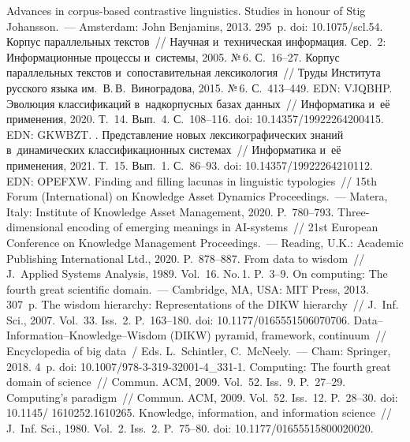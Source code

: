 \begin{multicols}{2}
{\small\frenchspacing
 { %
 \begin{thebibliography}{99}
 Advances in corpus-based contrastive linguistics. Studies in honour 
of Stig Johansson.~--- Amsterdam: John Benjamins, 2013. 295~p.  doi: 10.1075/scl.54.
 Корпус параллельных текстов~// 
Научная и~техническая информация. Сер.~2: Информационные процессы и~сис\-те\-мы, 2005. 
№\,6. С.~16--27.
 Корпус параллельных текстов и~сопоставительная 
лексикология~// Труды Института русского языка им.\ В.\,В.~Виноградова, 2015. №\,6. 
С.~413--449. EDN: VJQBHP.
 Эволюция классификаций 
в~надкорпусных базах данных~// Информатика и~её применения, 2020. Т.~14. Вып.~4. 
С.~108--116. doi: 10.14357/19922264200415.  
EDN: \mbox{GKWBZT}.
. Представление новых 
лексикографических знаний в~динамических классификационных сис\-те\-мах~// 
Информатика и~её применения, 2021. Т.~15. Вып.~1. С.~86--93.  doi: 10.14357/19922264210112. EDN: OPEFXW.
 Finding and filling lacunas in linguistic typologies~// 15th Forum (International) 
on Knowledge Asset Dynamics Proceedings.~--- Matera, Italy: Institute of Knowledge Asset 
Management, 2020. P.~780--793.
 Three-dimensional encoding of emerging meanings in AI-systems~// 21st 
European Conference on Knowledge Management Proceedings.~--- Reading, U.K.: Academic 
Publishing International Ltd., 2020. P.~878--887.
 From data to wisdom~// J.~Applied Systems Analysis, 1989. Vol.~16. No.\,1. P.~3--9.
 On computing: The fourth great scientific domain.~--- Cambridge, MA, 
USA: MIT Press, 2013. 307~p.
 The wisdom hierarchy: Representations of the DIKW hierarchy~// J.~Inf. 
Sci., 2007. Vol.~33. Iss.~2. P.~163--180. doi: 10.1177/0165551506070706.
 Data--Information--Knowledge--Wisdom (DIKW) pyramid, 
framework, continuum~// Encyclopedia of big data~/ Eds. L.~Schintler, C.~McNeely.~--- Cham: 
Springer, 2018. 4~p. doi: 10.1007/978-3-319-32001-4\_331-1.
 Computing: The fourth great domain of science~// Commun. 
ACM, 2009. Vol.~52. Iss.~9. P.~27--29.
 Computing's paradigm~// Commun.  ACM, 2009. Vol.~52. 
Iss.~12. P.~28--30. doi: 10.1145/ 1610252.1610265.
 Knowledge, information, and information science~// J.~Inf. Sci., 
1980. Vol.~2. Iss.~2. P.~75--80. doi: 10.1177/01655515800020020.


\end{thebibliography}}}
\end{multicols}
